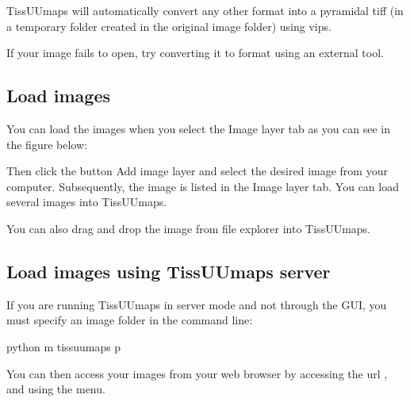\documentclass[letterpaper,10pt,english,openany,oneside]{sphinxmanual}
\begin{document}
\sphinxAtStartPar
TissUUmaps will automatically convert any other format into a pyramidal tiff (in a temporary  folder created in the original image folder) using vips.

\sphinxAtStartPar
If your image fails to open, try converting it to  format using an external tool.


\subsection{Load images}
\label{\detokenize{docs/starting/images:load-images}}
\sphinxAtStartPar
You can load the images when you select the Image layer tab as you can see in the figure below:

\sphinxAtStartPar
Then click the button Add image layer and select the desired image from your computer. Subsequently, the image is listed in the Image layer tab. You can load several images into TissUUmaps.

\sphinxAtStartPar
You can also drag and drop the image from file explorer into TissUUmaps.


\subsection{Load images using TissUUmaps server}
\label{\detokenize{docs/starting/images:load-images-using-tissuumaps-server}}
\sphinxAtStartPar
If you are running TissUUmaps in server mode and not through the GUI, you must specify an image folder in the command line:

\begin{sphinxVerbatim}[commandchars=\\\{\}]
python \PYGZhy{}m tissuumaps  \PYGZhy{}p 
\end{sphinxVerbatim}

\sphinxAtStartPar
You can then access your images from your web browser by accessing the url , and using the  menu.

\sphinxAtStartPar
{}

\sphinxAtStartPar
{}
\end{document}
